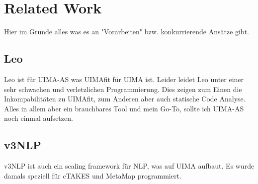 \section{Related Work}
\label{sec:related}
Hier im Grunde alles was es an "Vorarbeiten" bzw. konkurrierende Ansätze gibt.

\subsection{Leo}
Leo ist für UIMA-AS was UIMAfit für UIMA ist. Leider leidet Leo unter einer sehr schwachen und verletzlichen Programmierung. Dies zeigen zum Einen die Inkompabilitäten zu UIMAfit, zum Anderen aber auch statische Code Analyse. Alles in allem aber ein brauchbares Tool und mein Go-To, sollte ich UIMA-AS noch einmal aufsetzen.

\subsection{v3NLP}
v3NLP ist auch ein scaling framework für NLP, was auf UIMA aufbaut. Es wurde damals speziell für cTAKES und MetaMap programmiert.



% 
% 
% 
